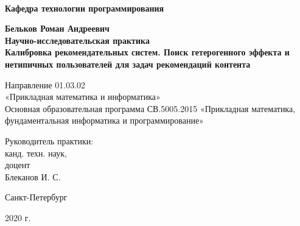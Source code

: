 
\begin{titlepage}
\begin{center}
\\
\textbf{Кафедра технологии программирования}

\vspace{22mm}

\textbf{\Large Бельков Роман Андреевич} \\[7mm]
\textbf{\large Научно-исследовательская практика}\\[12mm]
\textbf{\Large Калибровка рекомендательных систем. Поиск гетерогенного эффекта и нетипичных пользователей для задач рекомендаций контента}

\vspace{12mm}
Направление 01.03.02 \\«Прикладная математика и информатика»\\
Основная образовательная программа СВ.5005.2015
«Прикладная математика, фундаментальная информатика и программирование»\\

\vspace{18mm}

\begin{flushleft}
{\setlength{\leftskip}{23em}
 {Руководитель практики:} \\
 канд. техн. наук, \\
 доцент \\ Блеканов И. С. \\
}
\end{flushleft}

\vfill

{Санкт-Петербург}
\par{2020 г.}
\end{center}
\end{titlepage}
\restoregeometry
\addtocounter{page}{1}